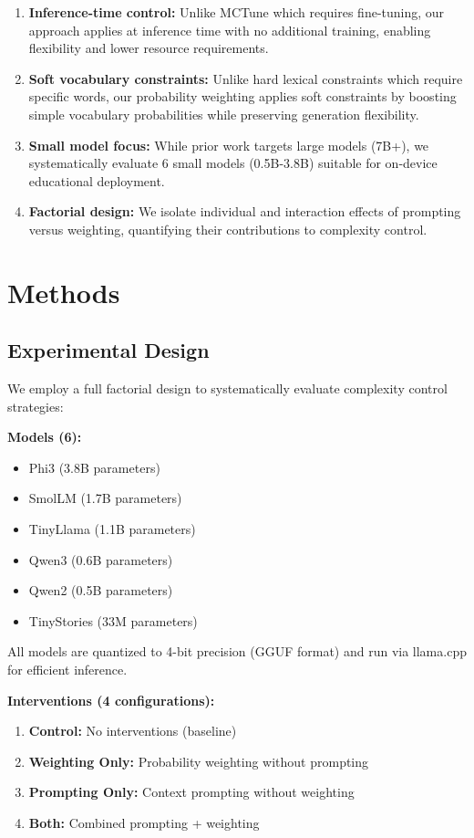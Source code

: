 \documentclass[10pt, a4paper]{article}
\begin{document}
\begin{enumerate}
\item \textbf{Inference-time control:} Unlike MCTune \citep{Nguyen2024} which requires fine-tuning, our approach applies at inference time with no additional training, enabling flexibility and lower resource requirements.
\item \textbf{Soft vocabulary constraints:} Unlike hard lexical constraints \citep{Li2024} which require specific words, our probability weighting applies soft constraints by boosting simple vocabulary probabilities while preserving generation flexibility.
\item \textbf{Small model focus:} While prior work targets large models (7B+), we systematically evaluate 6 small models (0.5B-3.8B) suitable for on-device educational deployment.
\item \textbf{Factorial design:} We isolate individual and interaction effects of prompting versus weighting, quantifying their contributions to complexity control.
\end{enumerate}

\section{Methods}

\subsection{Experimental Design}

We employ a full factorial design to systematically evaluate complexity control strategies:

\textbf{Models (6):}
\begin{itemize}
\item Phi3 (3.8B parameters)
\item SmolLM (1.7B parameters)  
\item TinyLlama (1.1B parameters)
\item Qwen3 (0.6B parameters)
\item Qwen2 (0.5B parameters)
\item TinyStories (33M parameters)
\end{itemize}

All models are quantized to 4-bit precision (GGUF format) and run via llama.cpp for efficient inference.

\textbf{Interventions (4 configurations):}
\begin{enumerate}
\item \textbf{Control:} No interventions (baseline)
\item \textbf{Weighting Only:} Probability weighting without prompting
\item \textbf{Prompting Only:} Context prompting without weighting
\item \textbf{Both:} Combined prompting + weighting
\end{enumerate}
\end{document}

